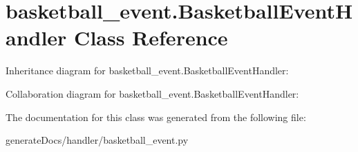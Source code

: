 \hypertarget{classbasketball__event_1_1_basketball_event_handler}{}\section{basketball\+\_\+event.\+Basketball\+Event\+Handler Class Reference}
\label{classbasketball__event_1_1_basketball_event_handler}


Inheritance diagram for basketball\+\_\+event.\+Basketball\+Event\+Handler\+:


Collaboration diagram for basketball\+\_\+event.\+Basketball\+Event\+Handler\+:


The documentation for this class was generated from the following file\+:\begin{DoxyCompactItemize}
\item 
generate\+Docs/handler/basketball\+\_\+event.\+py\end{DoxyCompactItemize}
